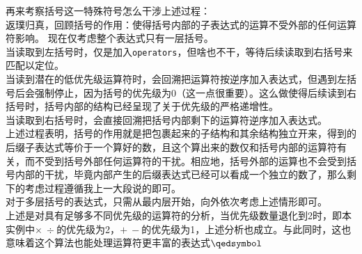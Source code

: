 \documentclass[UTF8]{ctexart}
\begin{document}
再来考察括号这一特殊符号怎么干涉上述过程：\\
返璞归真，回顾括号的作用：使得括号内部的子表达式的运算不受外部的任何运算符影响。
现在仅考虑整个表达式只有一层括号。\\
当读取到左括号时，仅是加入\verb|operators|，但啥也不干，等待后续读取到右括号来匹配以定位。\\
当读到潜在的低优先级运算符时，会回溯把运算符按逆序加入表达式，但遇到左括号后会强制停止，因为括号的优先级为0（这一点很重要）。这么做使得后续读到右括号时，括号内部的结构已经呈现了关于优先级的严格递增性。\\
当读取到右括号时，会直接回溯把括号内部剩下的运算符逆序加入表达式。\\
上述过程表明，括号的作用就是把包裹起来的子结构和其余结构独立开来，得到的后缀子表达式等价于一个算好的数，且这个算出来的数仅和括号内部的运算符有关，而不受到括号外部任何运算符的干扰。相应地，括号外部的运算也不会受到括号内部的干扰，毕竟内部产生的后缀表达式已经可以看成一个独立的数了，那么剩下的考虑过程遵循我上一大段说的即可。\\
对于多层括号的表达式，只需从最内层开始，向外依次考虑上述情形即可。\\

上述是对具有足够多不同优先级的运算符的分析，当优先级数量退化到2时，即本实例中$\times\ \div$的优先级为2，$+\ -$的优先级为1，上述分析也成立。与此同时，这也意味着这个算法也能处理运算符更丰富的表达式$\qedsymbol$ \\
\end{document}
